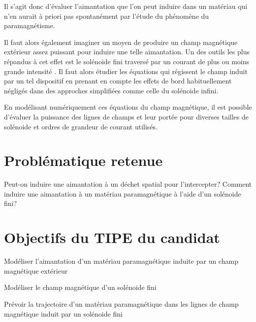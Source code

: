 \documentclass[a4paper,1pt]{article}
\begin{document}
Il s'agit donc d'évaluer l'aimantation que l'on peut induire dans un matériau qui n'en aurait à priori pas spontanément par l'étude du phénomène du paramagnétisme.

Il faut alors également imaginer un moyen de produire un champ magnétique extérieur assez puissant pour induire une telle aimantation. Un des outils les plus répandus à cet effet est le solénoide fini traversé par un courant de plus ou moins grande intensité \cite{Solenoide}. Il faut alors étudier les équations qui régissent le champ induit par un tel dispositif en prenant en compte les effets de bord habituellement négligés dans des approches simplifiées comme celle du solénoide infini. 

En modélisant numériquement ces équations du champ magnétique, il est possible d'évaluer la puissance des lignes de champs et leur portée pour diverses tailles de solénoide et ordres de grandeur de courant utilisés.

\section{Problématique retenue}
Peut-on induire une aimantation à un déchet spatial pour l'intercepter? Comment induire une aimantation à un matériau paramagnétique à l'aide d'un solénoide fini?

\section{Objectifs du TIPE du candidat}
Modéliser l'aimantation d'un matériau paramagnétique induite par un champ magnétique extérieur

Modéliser le champ magnétique d'un solénoide fini

Prévoir la trajectoire d'un matériau paramagnétique dans les lignes de champ magnétique induit par un solénoide fini
\end{document}
